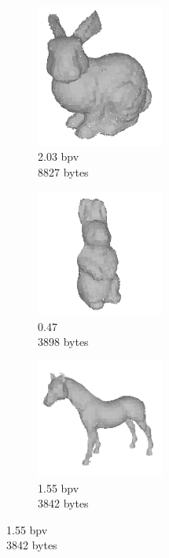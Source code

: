 \begin{figure}[t] 
        \centering
 		\begin{subfigure}[b]{4.4cm}
                \includegraphics[width=4.2cm]{images/results/compression/bunnyb}
                \caption{2.03 bpv\\8827 bytes}
                \label{fig:FIG_BUNNYB}
        \end{subfigure}%
        \begin{subfigure}[b]{4.4cm}
                \includegraphics[width=4.2cm]{images/results/compression/rabbitb}
                \caption{0.47\\3898 bytes}
                \label{fig:FIG_RABBITB}
        \end{subfigure}%
        \begin{subfigure}[b]{4.4cm}
                \includegraphics[width=4.2cm]{images/results/compression/horseb}
                \caption{1.55 bpv\\3842 bytes}
                \label{fig:FIG_HORSEB}
        \end{subfigure}


\end{figure}
